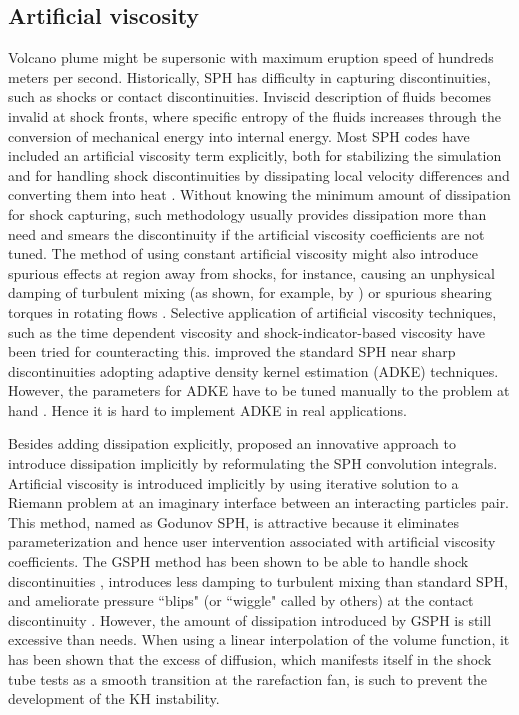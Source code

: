\subsection{Artificial viscosity}

Volcano plume might be supersonic with maximum eruption speed of hundreds meters per second.
Historically, SPH has difficulty in capturing discontinuities, such as shocks or contact discontinuities. Inviscid description of fluids becomes invalid at shock fronts, where specific entropy of the fluids increases through the conversion of mechanical energy into internal energy. Most SPH codes have included an artificial viscosity term explicitly, both for stabilizing the simulation and for handling shock discontinuities by dissipating local velocity differences and converting them into heat \citep{monaghan1983shock, monaghan1997sph, klapp2012strong}. Without knowing the minimum amount of dissipation for shock capturing, such methodology usually provides dissipation more than need and smears the discontinuity if the artificial viscosity coefficients are not tuned. The method of using constant artificial viscosity might also introduce spurious effects at region away from shocks, for instance, causing an unphysical damping of turbulent mixing (as shown, for example, by \citet{borgani2012hydrodynamic}) or spurious
shearing torques in rotating flows \citep{flebbe1994smoothed}. Selective application of artificial viscosity techniques, such as the time dependent viscosity \citep{morris1997switch, dolag2005turbulent} and shock-indicator-based viscosity \citep{cullen2010inviscid} have been tried for counteracting this. 
\citet{sigalotti2008adaptive} improved the standard SPH near sharp discontinuities adopting adaptive density kernel estimation (ADKE) techniques. However, the parameters for ADKE have to be tuned manually to the problem at hand \citep{puri2014comparison}. Hence it is hard to implement ADKE in real applications.

Besides adding dissipation explicitly, \citet{inutsuka2002reformulation} proposed an innovative approach to introduce dissipation implicitly by reformulating the SPH convolution integrals. Artificial viscosity is introduced implicitly by using iterative solution to a Riemann problem at an imaginary interface between an interacting particles pair. This method, named as Godunov SPH, is attractive because it eliminates parameterization and hence user intervention associated with artificial viscosity coefficients. The GSPH method has been shown to be able to handle shock discontinuities \citep{inutsuka2002reformulation, cha2003implementations,iwasaki2011smoothed, puri2014approximate}, introduces less damping to turbulent mixing \citep{cha2010kelvin, borgani2012hydrodynamic} than standard SPH, and ameliorate pressure ``blips" (or ``wiggle" called by others) at the contact discontinuity \citep{borgani2012hydrodynamic}. However, the amount of dissipation introduced by GSPH is still excessive than needs. When using a linear interpolation of the volume function, it has been shown \citep{borgani2012hydrodynamic} that the excess of diffusion, which manifests itself in the shock tube tests as a smooth transition at the rarefaction fan, is such to prevent the development of the KH instability.

